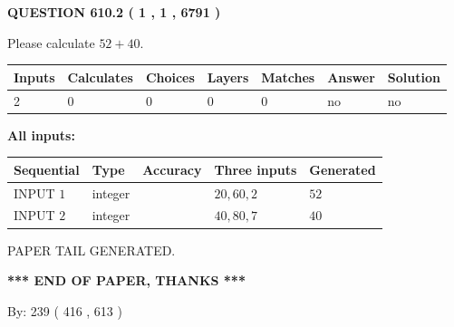 \documentclass[12pt]{article}
\begin{document}
   
  
\vspace{0.2in}
  
{\textbf{\Large{QUESTION
610.2 
 ( 1 , 1 , 6791 )
}}}
  
  
 
Please calculate $ %
52 +  %
40 $.
 
 
   
   
   
   
\noindent\begin{tabular}{|l|l|l|l|l|l|l|}
 \hline
Inputs & Calculates & Choices & Layers & Matches & Answer & Solution \\ \hline
 2  & 
 0  & 
 0
  & 
 0  & 
 0  & 
  no & 
  no 
  \\ \hline
 \end{tabular}
   
   
   
   
\noindent{}
   
   
   
   
\noindent\vspace{0.1in}\hspace{-0.08in} {\textbf{\Large{All inputs: }}}
   
   
  
  
\noindent\begin{tabular}{|l|l|l|l|l|}
\hline
 Sequential & Type & Accuracy & Three inputs & Generated \\ 
\hline
 
 
  INPUT $  1 $ & integer &  & $
 20
 , 
 60
 , 
 2
 $ & $ 52 $ 
 \\  \hline  
 
 
  INPUT $  2 $ & integer &  & $
 40
 , 
 80
 , 
 7
 $ & $ 40 $ 
 \\  \hline  
 \end{tabular}
   
   
   
   
   
   
 \vspace{0.2in}
 
   
   
\vspace{2.0in} PAPER TAIL GENERATED.
   
   
   
   
\vspace{1.0in} 
{\textbf{\large{ *** END OF PAPER, THANKS *** }}} 
   
   
\hspace{1.0in} By: 
 239 ( 416 ,  613 )
   
\end{document}
